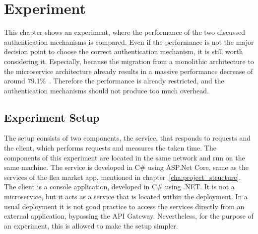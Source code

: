 \chapter{Experiment}
\label{cha:experiment}
This chapter shows an experiment, where the performance of the two discussed authentication mechanisms is compared.
Even if the performance is not the major decision point to choose the correct authentication mechanism, it is still worth considering it.
Especially, because the migration from a monolithic architecture to the microservice architecture already results in a massive performance decrease of around 79.1\%~\cite{ueda2016workload}.
Therefore the performance is already restricted, and the authentication mechanisms should not produce too much overhead.

\section{Experiment Setup}
The setup consists of two components, the service, that responds to requests and the client, which performs requests and measures the taken time.
The components of this experiment are located in the same network and run on the same machine.
The service is developed in C\# using ASP.Net Core, same as the services of the flea market app, mentioned in chapter~\ref{cha:project_structure}.
The client is a console application, developed in C\# using .NET.
It is not a microservice, but it acts as a service that is located within the deployment.
In a usual deployment it is not good practice to access the services directly from an external application, bypassing the API Gateway.
Nevertheless, for the purpose of an experiment, this is allowed to make the setup simpler. 



